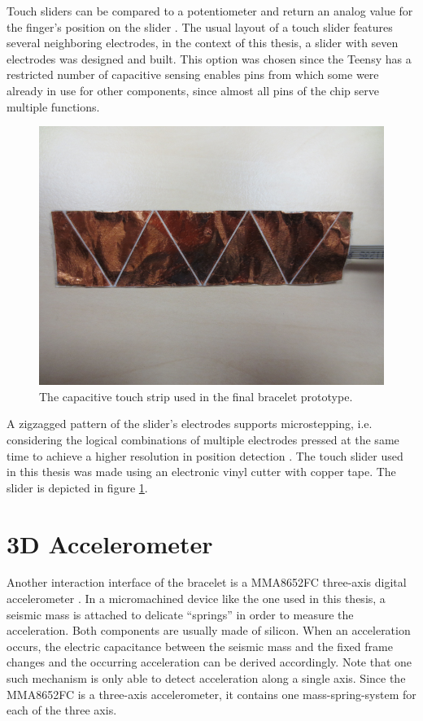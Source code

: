 Touch sliders can be compared to a potentiometer and return an analog value for the finger's position on the slider \cite{Camacho2010}. The usual layout of a touch slider features several neighboring electrodes, in the context of this thesis, a slider with seven electrodes was designed and built. This option was chosen since the Teensy has a restricted number of capacitive sensing enables pins from which some were already in use for other components, since almost all pins of the chip serve multiple functions.

\begin{figure}[bth]
	\begin{center}
	\includegraphics[width=.5\linewidth]{gfx/touchstrip.png}
	\end{center}
	\caption{The capacitive touch strip used in the final bracelet prototype.}\label{fig:touch}
\end{figure}

A zigzagged pattern of the slider's electrodes supports microstepping, i.e. considering the logical combinations of multiple electrodes pressed at the same time to achieve a higher resolution in position detection \cite{Camacho2010}. The touch slider used in this thesis was made using an electronic vinyl cutter with copper tape. The slider is depicted in figure \ref{fig:touch}.

\section{3D Accelerometer}
\label{sec:accel}
Another interaction interface of the bracelet is a MMA8652FC three-axis digital accelerometer \cite{datasheet:mma8652}. In a micromachined device like the one used in this thesis, a seismic mass is attached to delicate ``springs'' in order to measure the acceleration. Both components are usually made of silicon. When an acceleration occurs, the electric capacitance between the seismic mass and the fixed frame changes and the occurring acceleration can be derived accordingly. Note that one such mechanism is only able to detect acceleration along a single axis. Since the MMA8652FC is a three-axis accelerometer, it contains one mass-spring-system for each of the three axis.

